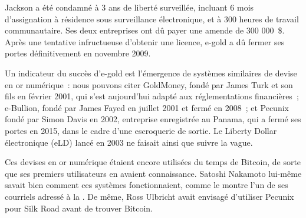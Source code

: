 
Jackson a été condamné à 3 ans de liberté surveillée, incluant 6 mois d'assignation à résidence sous surveillance électronique, et à 300 heures de travail communautaire. Ses deux entreprises ont dû payer une amende de 300 000~\$. Après une tentative infructueuse d'obtenir une licence, e-gold a dû fermer ses portes définitivement en novembre 2009.

Un indicateur du succès d'e-gold est l'émergence de systèmes similaires de devise en or numérique~: nous pouvons citer GoldMoney, fondé par James Turk et son fils en février 2001, qui s'est aujourd'hui adapté aux réglementations financières~; e-Bullion, fondé par James Fayed en juillet 2001 et fermé en 2008~; et Pecunix fondé par Simon Davis en 2002, entreprise enregistrée au Panama, qui a fermé ses portes en 2015, dans le cadre d'une escroquerie de sortie. Le Liberty Dollar électronique (eLD) lancé en 2003 ne faisait ainsi que suivre la vague.

Ces devises en or numérique étaient encore utilisées du temps de Bitcoin, de sorte que ses premiers utilisateurs en avaient connaissance. Satoshi Nakamoto lui-même savait bien comment ces systèmes fonctionnaient, comme le montre l'un de ses courriels adressé à la . De même, Ross Ulbricht avait envisagé d'utiliser Pecunix pour Silk Road avant de trouver Bitcoin.


